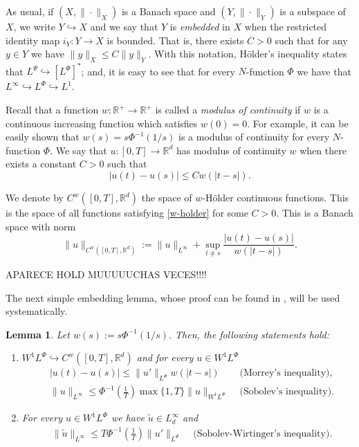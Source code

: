 \documentclass[twoside]{article}
\newtheorem{lem}[thm]{Lemma}
\theoremstyle{remark}
\newcommand{\orlnor}{\|_{L^{\Phi}}}
\newcommand{\lphi}{L^{\Phi}}
\newcommand{\lpsi}{L^{\Psi}}
\newcommand{\wphi}{W^{1}\lphi}
\newcommand{\sobnor}{\|_{W^{1}\lphi}}
\newcommand{\rr}{\mathbb{R}}
\renewcommand{\leq}{\leqslant}
\newcounter{example}
\begin{document}
As usual, if $(X,\|\cdot\|_X)$ is a Banach space and $(Y,\|\cdot \|_Y)$ is a subspace of $X$,  we write $Y\hookrightarrow X$ and we say that $Y$ is \emph{embedded} in $X$  when the restricted identity map $i_Y:Y\to X$ is bounded. That is, there exists $C>0$ such that  for any $y\in Y$ we have $\|y\|_X\leq C\|y\|_Y$.  With this notation, H\"older's inequality states that  $\lpsi\hookrightarrow  \left[\lphi\right]^*$; and, it is easy to see that for every $N$-function $\Phi$ we have that $L^{\infty}\hookrightarrow\lphi \hookrightarrow L^1$.


 Recall that a function   $w:\mathbb{R}^+\to \mathbb{R}^+$ is called  a \emph{modulus of continuity} if $w$ is a continuous increasing function which satisfies $w(0)=0$. For example, it can be easily shown that $w(s)=s\Phi^{-1}(1/s)$ is a modulus of  continuity for every $N$-function $\Phi$.  We say that $u:[0,T]\to\rr^d$  has modulus of continuity $w$  when there exists a constant $C>0$ such that
\begin{equation}\label{w-holder}|u(t)-u(s)|\leq Cw(|t-s|).
\end{equation}


We denote by $C^w([0,T],\rr^d)$  the space of  $w$-H\"older continuous functions. This is the space of all functions satisfying \eqref{w-holder} for some $C>0$. This is a Banach space with norm
\[\|u\|_{  C^w([0,T],\rr^d) }  :=\|u\|_{L^{\infty}}+\sup\limits_{t\neq s}\frac{|u(t)-u(s)|}{w(|t-s|)}.\]


APARECE HOLD MUUUUUCHAS VECES!!!!



The next simple  embedding lemma, whose proof can be found in \cite{ABGMS2015}, will be used systematically.




\begin{lem}\label{inclusion orlicz} Let  $w(s):= s\Phi^{-1}(1/s)$. Then, the following statements hold:
\begin{enumerate}
\item\label{inclusion orlicz_item1} $\wphi\hookrightarrow C^w([0,T],\rr^d) $ and for every $u\in\wphi$
\begin{align}
 &\left|u(t)-u(s) \right| \leq  \|u'\orlnor w(| t-s|)&\text{  (Morrey's inequality),}\label{in-sob-cont}
\\
& \|u\|_{L^{\infty}} \leq\Phi^{-1}\left(\frac{1}{T}\right)\max\{1,T\}\|u\sobnor&\text{  (Sobolev's inequality).}\label{sobolev}
\end{align}
\item For every $u\in\wphi$ we have $\widetilde{u}\in L^{\infty}_d$ and
\begin{align}
& \|\widetilde{u}\|_{L^{\infty}} \leq T\Phi^{-1}\left(\frac{1}{T}\right)\|u'\orlnor&
\text{  (Sobolev-Wirtinger's inequality).}\label{wirtinger}
\end{align}




\end{enumerate}
\end{lem}
\end{document}
